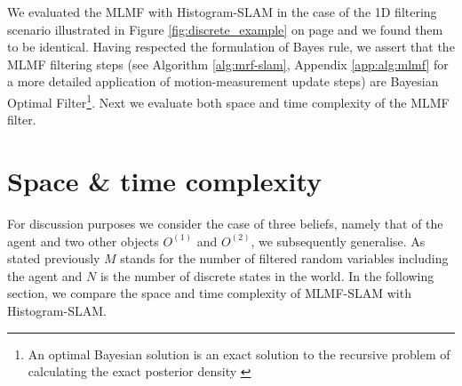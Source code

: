 \documentclass{frontiersSCNS} %
\begin{document}
\begin{table}[h]
\centering
{}
\caption{MLMF functions with associated parameters. The marginal parameters are the discretisation of the 
state space $\boldsymbol{\theta} \in \mathbb{R}^N$, $\boldsymbol{\theta}^{(s)}$ correspond to the probability being in state $s$.}
\label{tab:mlmf_parameters}
\end{table}

We evaluated the MLMF with Histogram-SLAM in the case of the 1D filtering scenario
illustrated in Figure \ref{fig:discrete_example} on page \pageref{fig:discrete_example} and we found them to be identical. Having respected the formulation of Bayes rule, we
assert that the MLMF filtering steps (see  Algorithm \ref{alg:mrf-slam}, Appendix \ref{app:alg:mlmf} for a more detailed application of motion-measurement update steps) are 
Bayesian Optimal Filter\footnote{An optimal Bayesian solution is an exact solution to the recursive problem of calculating the exact posterior density \cite{PF_tutorial_2002}}. 
Next we evaluate both space and time complexity of the MLMF filter.

\section{Space \& time complexity}

For discussion purposes we consider the case of three beliefs, namely that of the agent and two other objects $O^{(1)}$ and $O^{(2)}$, we
subsequently generalise. As stated previously $M$ stands for the number of filtered random variables including the agent and
$N$ is the number of discrete states in the world. In the following section, we compare the space and time complexity 
of MLMF-SLAM with Histogram-SLAM.
\end{document}
